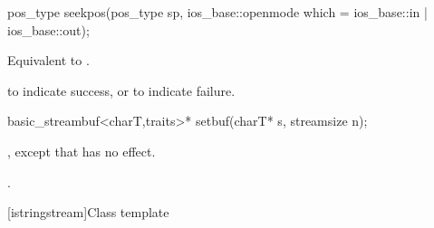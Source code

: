 %
\begin{itemdecl}
pos_type seekpos(pos_type sp, ios_base::openmode which
                   = ios_base::in | ios_base::out);
\end{itemdecl}

\begin{itemdescr}
\pnum
\effects
Equivalent to .

\pnum
\returns
{}
to indicate success, or
to indicate failure.
\end{itemdescr}

%
%
\begin{itemdecl}
basic_streambuf<charT,traits>* setbuf(charT* s, streamsize n);
\end{itemdecl}

\begin{itemdescr}
\pnum
\effects
{}%
,
except that
has no effect.

\pnum
\returns
{}.
\end{itemdescr}

[istringstream]{Class template }

